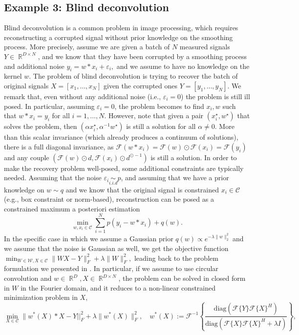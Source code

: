 \documentclass{article}
\DeclareMathOperator{\R}{\mathbb{R}}
\begin{document}
 \subsection{Example 3: Blind deconvolution}\label{subsec:blind_deconvolution}
Blind deconvolution is a common problem in image processing, which requires reconstructing a corrupted signal without prior knowledge on the smoothing process. More precisely, assume we are given a batch of $N$ measured signals $Y \in \R^{D \times N}$, and we know that they have been corrupted by a smoothing process and additional noise $y_i = w  *x_i + \varepsilon_i,$
and we assume to have no knowledge on the kernel $w$. The problem of blind deconvolution is trying to recover the batch of original signals $X = [x_1,\dots,x_N]$ given the corrupted ones $Y = [y_1,\dots,y_N]$. We remark that, even without any additional noise (i.e., $\varepsilon_i=0$) the problem is still ill posed. In particular, assuming $\varepsilon_i=0$, the problem becomes to find $x_i,w$ such that $w * x_i = y_i$ for all $i=1,\dots,N$. However, note  that given a pair $(x_i^\star,w^\star)$ that solves the problem, then $(\alpha x_i^\star,\alpha^{-1}w^\star)$ is still a solution for all $\alpha \ne 0$. More than this scalar invariance (which already produces a continuum of solutions), there is a full diagonal invariance, as
$\mathcal F(w * x_i) = \mathcal F(w) \odot \mathcal F(x_i) = \mathcal F(y_i)$
and any couple $(\mathcal F(w) \odot d, \mathcal F(x_i) \odot d^{\odot -1})$ is still a solution. In order to make the recovery problem well-posed, some additional constraints are typically needed. Assuming that the noise $\varepsilon_i \underset{i.i.d}{\sim} p$, and assuming that we have a prior knowledge on $w \sim q$ and we know that the original signal is constrained $x_i \in \mathcal C$ (e.g., box constraint or norm-based), reconstruction can be posed as a constrained maximum a posteriori estimation
\[
\min_{w,x_i \in \mathcal C} \sum_{i=1}^Np(y_i-w* x_i) +  q(w).
\]
In the specific case in which we assume a Gaussian prior $q(w) \propto e^{-\lambda \| w\|_2^2}$ and we assume that the noise is Gaussian as well, we get the objective function
$
\min_{W \in \mathscr W,X \in \mathcal C} \|WX-Y \|_F^2 + \lambda \|W \|_F^2,
$
leading back to the problem formulation we presented in . In particular, if we assume to use circular convolution and $w \in \R^{D}, X \in \R^{D \times N}$, the problem can be solved in closed form in $W$ in the Fourier domain, and it reduces to a non-linear constrained minimization problem in $X$,
\begin{equation}\label{eq:blind_deconvolution_formulation}
\min_{X \in \mathcal C}  \| w^*(X) * X- Y ||_F^2 + \lambda \|w^*(X) \|_F^2, \quad w^*(X):=\mathcal F^{-1}\left\{\frac{\mathrm{diag}(\mathcal F\{ Y\}\mathcal F\{ X\}^H)}{\mathrm{diag}(\mathcal F\{ X\} \mathcal F\{ X\}^H + \lambda I)}
\right\},\end{equation}
\end{document}
